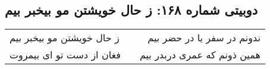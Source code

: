 \begin{center}
\section*{دوبیتی شماره ۱۶۸: ز حال خویشتن مو بیخبر بیم}
\label{sec:168}
\begin{longtable}{l p{0.5cm} r}
ز حال خویشتن مو بیخبر بیم
&&
ندونم در سفر یا در حضر بیم
\\
فغان از دست تو ای بیمروت
&&
همین ذونم که عمری دربدر بیم
\\
\end{longtable}
\end{center}

